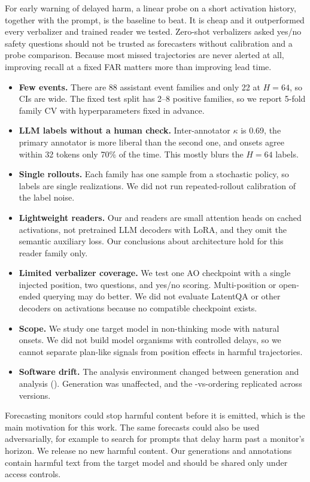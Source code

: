 For early warning of delayed harm, a linear probe on a short activation history, together with the prompt, is the baseline to beat. It is cheap and it outperformed every verbalizer and trained reader we tested. Zero-shot verbalizers asked yes/no safety questions should not be trusted as forecasters without calibration and a probe comparison. Because most missed trajectories are never alerted at all, improving recall at a fixed FAR matters more than improving lead time.

\begin{itemize}[leftmargin=*,itemsep=0pt,topsep=0pt]
    \item \textbf{Few events.} There are 88 assistant event families and only 22 at $H{=}64$, so CIs are wide. The fixed test split has 2--8 positive families, so we report 5-fold family CV with hyperparameters fixed in advance.
    \item \textbf{LLM labels without a human check.} Inter-annotator $\kappa$ is 0.69, the primary annotator is more liberal than the second one, and onsets agree within 32 tokens only 70\% of the time. This mostly blurs the $H{=}64$ labels.
    \item \textbf{Single rollouts.} Each family has one sample from a stochastic policy, so labels are single realizations. We did not run repeated-rollout calibration of the label noise.
    \item \textbf{Lightweight readers.} Our \direct and \forecast readers are small attention heads on cached activations, not pretrained LLM decoders with LoRA, and they omit the semantic auxiliary loss. Our conclusions about architecture hold for this reader family only.
    \item \textbf{Limited verbalizer coverage.} We test one AO checkpoint with a single injected position, two questions, and yes/no scoring. Multi-position or open-ended querying may do better. We did not evaluate LatentQA or other decoders on \qwen activations because no compatible checkpoint exists.
    \item \textbf{Scope.} We study one target model in non-thinking mode with natural onsets. We did not build model organisms with controlled delays, so we cannot separate plan-like signals from position effects in harmful trajectories.
    \item \textbf{Software drift.} The analysis environment changed between generation and analysis (). Generation was unaffected, and the \direct-vs-\forecast ordering replicated across versions.
\end{itemize}

Forecasting monitors could stop harmful content before it is emitted, which is the main motivation for this work. The same forecasts could also be used adversarially, for example to search for prompts that delay harm past a monitor's horizon. We release no new harmful content. Our generations and annotations contain harmful text from the target model and should be shared only under access controls.
